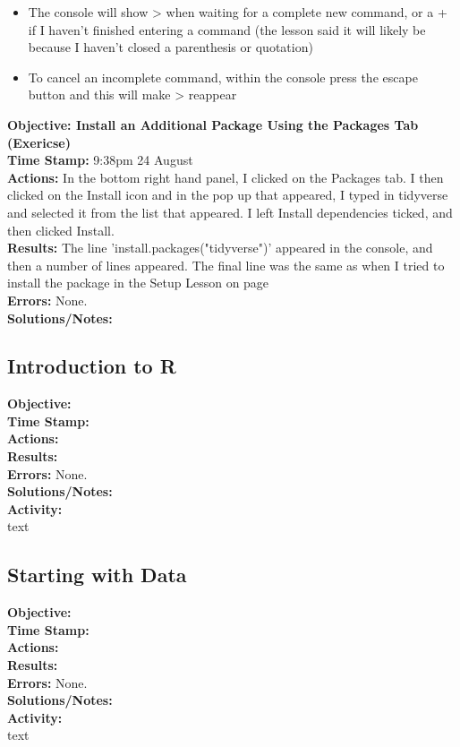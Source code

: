 \documentclass{article}
\begin{document}
\begin{FlushLeft}
\begin{itemize}
    \item The console will show \textgreater{} when waiting for a complete new command, or a + if I haven't finished entering a command (the lesson said it will likely be because I haven't closed a parenthesis or quotation)
    \item To cancel an incomplete command, within the console press the escape button and this will make \textgreater{} reappear
\end{itemize}
\vspace{5mm}
\textbf{Objective: Install an Additional Package Using the Packages Tab (Exericse)}\\ 
\textbf{Time Stamp:} 9:38pm 24 August\\
\textbf{Actions:} In the bottom right hand panel, I clicked on the Packages tab. I then clicked on the Install icon and in the pop up that appeared, I typed in tidyverse and selected it from the list that appeared. I left Install dependencies ticked, and then clicked Install.\\
\textbf{Results:} The line 'install.packages("tidyverse")' appeared in the console, and then a number of lines appeared. The final line was the same as when I tried to install the package in the Setup Lesson on page \pageref{Setup}  \\
\textbf{Errors:} None.\\
\textbf{Solutions/Notes:}\\

\subsection{Introduction to R}
\textbf{Objective: }\\ 
\textbf{Time Stamp:} \\
\textbf{Actions:} \\
\textbf{Results:}\\
\textbf{Errors:} None.\\
\textbf{Solutions/Notes:}\\
\vspace{5mm}
\textbf{Activity: }\\ 
text\\

\subsection{Starting with Data}
\textbf{Objective: }\\ 
\textbf{Time Stamp:} \\
\textbf{Actions:} \\
\textbf{Results:}\\
\textbf{Errors:} None.\\
\textbf{Solutions/Notes:}\\
\vspace{5mm}
\textbf{Activity: }\\ 
text\\


\end{FlushLeft}
\end{document}
